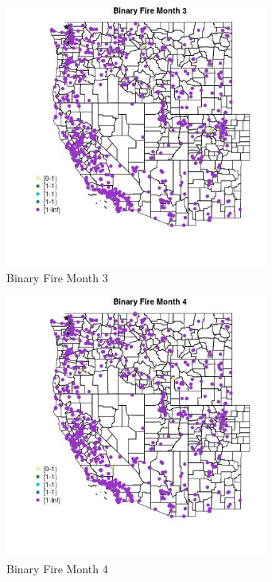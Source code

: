 \begin{figure} 
\centering  
\includegraphics[width=0.77\textwidth]{Code_Outputs/Report_ML_input_PM25_Step4_part_f_de_duplicated_aveswNAs_MapObsMo3Binary_Fire.jpg} 
\caption{\label{fig:Report_ML_input_PM25_Step4_part_f_de_duplicated_aveswNAsMapObsMo3Binary_Fire}Binary Fire Month 3} 
\end{figure} 
 

\clearpage 

\begin{figure} 
\centering  
\includegraphics[width=0.77\textwidth]{Code_Outputs/Report_ML_input_PM25_Step4_part_f_de_duplicated_aveswNAs_MapObsMo4Binary_Fire.jpg} 
\caption{\label{fig:Report_ML_input_PM25_Step4_part_f_de_duplicated_aveswNAsMapObsMo4Binary_Fire}Binary Fire Month 4} 
\end{figure} 
 


